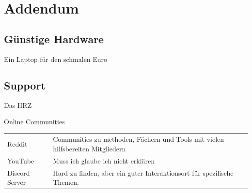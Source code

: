 \documentclass[aspectratio=169,shownotes]{beamer}
\begin{document}
\section{Addendum}
\subsection{Günstige Hardware}
\begin{frame}{Ein Laptop für den schmalen Euro}
    
\end{frame}

\subsection{Support}

\begin{frame}{Das HRZ}
    
\end{frame}

\begin{frame}{Online Communities}
    \begin{tabularx}{\linewidth}{ll}
        Reddit & Communities zu methoden, Fächern und Tools mit vielen hilfsbereiten Mitgliedern\\
        YouTube & Muss ich glaube ich nicht erklären\\
        Discord Server & Hard zu finden, aber ein guter Interaktionsort für spezifische Themen.\\

    \end{tabularx}
\end{frame}
\end{document}
